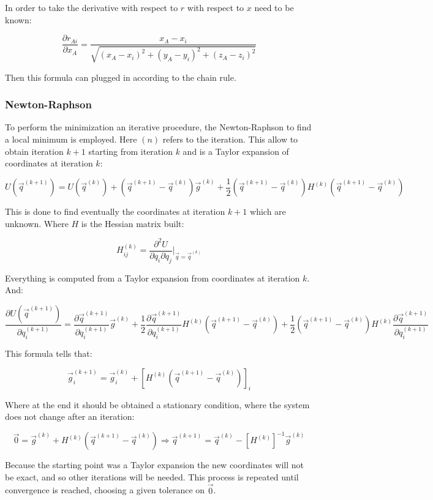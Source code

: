 	In order to take the derivative with respect to $r$ with respect to $x$ need to be known:

	$$\frac{\partial r_{Ai}}{\partial x_A} = \frac{x_A-x_i}{\sqrt{(x_A-x_i)^2+(y_A-y_i)^2+(z_A-z_i)^2}}$$

	Then this formula can plugged in according to the chain rule.

		\subsubsection{Newton-Raphson}
		To perform the minimization an iterative procedure, the Newton-Raphson to find a local minimum is employed.
		Here $(n)$ refers to the iteration.
		This allow to obtain iteration $k+1$ starting from iteration $k$ and is a Taylor expansion of coordinates at iteration $k$:

		$$U(\vec{q}^{(k+1)}) = U(\vec{q}^{(k)}) + (\vec{q}^{(k+1)} -\vec{q}^{(k)})\vec{g}^{(k)} + \frac{1}{2}(\vec{q}^{(k+1)}-\vec{q}^{(k)})H^{(k)}(\vec{q}^{(k+1)}-\vec{q}^{(k)})$$

		This is done to find eventually the coordinates at iteration $k+1$ which are unknown.
		Where $H$ is the Hessian matrix built:

		$$H_{ij}^{(k)} = \frac{\partial^2 U}{\partial q_i\partial q_j}|_{\vec{q}=\vec{q}^{(k)}}$$

		Everything is computed from a Taylor expansion from coordinates at iteration $k$.
		And:

		$$\frac{\partial U(\vec{q}^{(k+1)})}{\partial q_i^{(k+1)}} = \frac{\partial \vec{q}^{(k+1)}}{\partial q_i^{(k+1)}}\vec{g}^{(k)}+ \frac{1}{2}\frac{\partial \vec{q}^{(k+1)}}{\partial q_i^{(k+1)}}H^{(k)}(\vec{q}^{(k+1)}-\vec{q}^{(k)})+\frac{1}{2}(\vec{q}^{(k+1)}-\vec{q}^{(k)})H^{(k)}\frac{\partial \vec{q}^{(k+1)}}{\partial q_i^{(k+1)}}$$

		This formula tells that:

		$$\vec{g}_i^{(k+1)} = \vec{g}_i^{(k)} + [H^{(k)}(\vec{q}^{(k+1)}-\vec{q}^{(k)})]_i$$

		Where at the end it should be obtained a stationary condition, where the system does not change after an iteration:

		$$\vec{0} = \vec{g}^{(k)} + H^{(k)}(\vec{q}^{(k+1)}-\vec{q}^{(k)})\Rightarrow \vec{q}^{(k+1)} = \vec{q}^{(k)} - [H^{(k)}]^{-1}\vec{g}^{(k)}$$

		Because the starting point was a Taylor expansion the new coordinates will not be exact, and so other iterations will be needed.
		This process is repeated until convergence is reached, choosing a given tolerance on $\vec{0}$.

